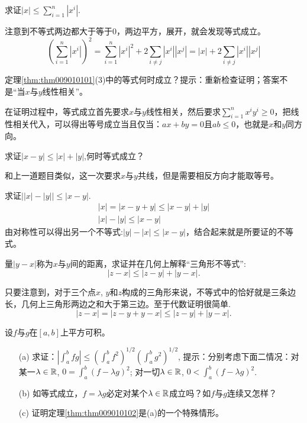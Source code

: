 \begin{problemset}
\item 求证$|x| \le \sum\limits_{i=1}^{n}{|x^i|}$.

注意到不等式两边都大于等于0，两边平方，展开，就会发现等式成立。
\[
(\sum_{i=1}^{n}{|x^i|})^2 = \sum_{i=1}^{n}{|x^i|^2} + 2\sum_{i \neq j}{|x^i||x^j|} = |x| + 2\sum_{i \neq j}{|x^i||x^j|}
\]

\item 定理\ref{thm:thm009010101}(3)中的等式何时成立？提示：重新检查证明；答案不是“当$x$与$y$线性相关”。

在证明过程中，等式成立首先要求$x$与$y$线性相关，然后要求$\sum_{i=1}^{n}{x^iy^i} \ge 0$，把线性相关代入，可以得出等号成立当且仅当：$ax+by=0$且$ab \le 0$，也就是$x$和$y$同方向。

\item 求证$|x-y| \le |x| + |y|$,何时等式成立？

和上一道题目类似，这一次要求$x$与$y$共线，但是需要相反方向才能取等号。

\item 求证$\left||x|-|y|\right| \le |x-y|$.
\begin{gather*}
|x| = |x-y+y| \le |x-y|+|y|\\
|x| - |y| \le |x-y|
\end{gather*}
由对称性可以得出另一个不等式:$|y|-|x| \le |x-y|$，结合起来就是所要证的不等式。

\item 量$|y-x|$称为$x$与$y$间的距离，求证并在几何上解释“三角形不等式”:
\[
|z-x| \le |z-y| + |y-x|.
\]

只要注意到，对于三个点$x$, $y$和$z$构成的三角形来说，不等式中的恰好就是三条边长，几何上三角形两边之和大于第三边。至于代数证明很简单.
\[
|z-x| = |z-y + y-x| \le |z-y| + |y-x|.
\]

\item 设$f$与$g$在$[a,b]$上平方可积。
\begin{enumerate}
\item[(a)]求证：$\left|\int_{a}^{b}{fg}\right| \le \left(\int_{a}^{b}{f^2}\right)^{1/2}\left(\int_{a}^{b}{g^2}\right)^{1/2}$, 提示：分别考虑下面二情况：对某一$\lambda \in\mathbb{R}$, $0 = \int_{a}^{b}{(f - \lambda{}g)^2}$; 对一切$\lambda \in \mathbb{R}$, $0 < \int_{a}^{b}{(f - \lambda{}g)^2}$.

\item[(b)]如等式成立，$f = \lambda{}g$必定对某个$\lambda \in \mathbb{R}$成立吗？如$f$与$g$连续又怎样？

\item[(c)]证明定理\ref{thm:thm009010102}是(a)的一个特殊情形。
\end{enumerate}


\end{problemset}
